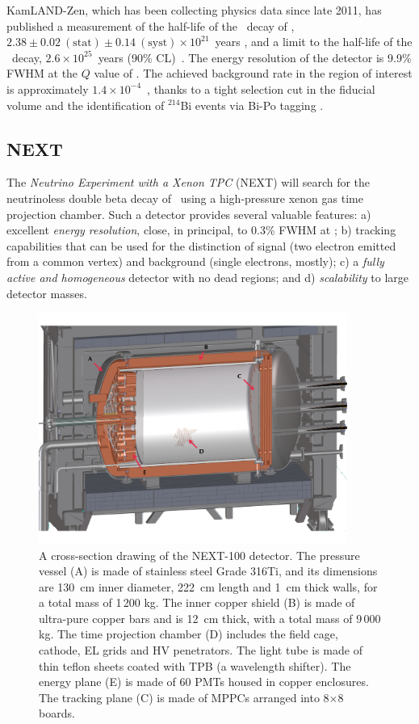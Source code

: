 \documentclass{PoS}
\begin{document}
KamLAND-Zen, which has been collecting physics data since late 2011, has published a measurement of the half-life of the \bbtnu\ decay of \XE, $2.38\pm0.02~(\mathrm{stat})\pm0.14~(\mathrm{syst})\times10^{21}$~years \cite{KamLANDZen:2012aa}, and a limit to the half-life of the \bbonu\ decay, $2.6\times10^{25}$~years (90\% CL)~\cite{Asakura:2014lma, Gando:2012zm}. The energy resolution of the detector is 9.9\% FWHM at the $Q$ value of \XE. The achieved background rate in the region of interest is approximately $1.4\times10^{-4}$~\ckky, thanks to a tight selection cut in the fiducial volume and the identification of $^{214}$Bi events via Bi-Po tagging \cite{Asakura:2014lma}.


\subsection{NEXT}
The \emph{Neutrino Experiment with a Xenon TPC} (NEXT) \cite{Gomez-Cadenas:2013lta} will search for the neutrinoless double beta decay of \XE\ using a high-pressure xenon gas time projection chamber. Such a detector provides several valuable features: a) excellent \emph{energy resolution}, close, in principal, to 0.3\% FWHM at \Qbb; b) {tracking capabilities} that can be used for the distinction of signal (two electron emitted from a common vertex) and background (single electrons, mostly); c) a \emph{fully active and homogeneous} detector with no dead regions; and d) \emph{scalability} to large detector masses.

\begin{figure}
\centering
\includegraphics[width=0.9\textwidth]{img/Next100.pdf}
\caption{A cross-section drawing of the NEXT-100 detector. The pressure vessel (A) is made of stainless steel Grade 316Ti, and its dimensions are 130~cm inner diameter, 222~cm length and 1~cm thick walls, for a total mass of 1\,200 kg. The inner copper shield (B) is made of ultra-pure copper bars and is 12~cm thick, with a total mass of 9\,000 kg. The time projection chamber (D) includes the field cage, cathode, EL grids and HV penetrators. The light tube is made of thin teflon sheets coated with TPB (a wavelength shifter). The energy plane (E) is made of 60 PMTs housed in copper enclosures. The tracking plane (C) is made of MPPCs arranged into 8$\times$8 boards.} \label{fig.NEXT100}
\end{figure}
\end{document}
